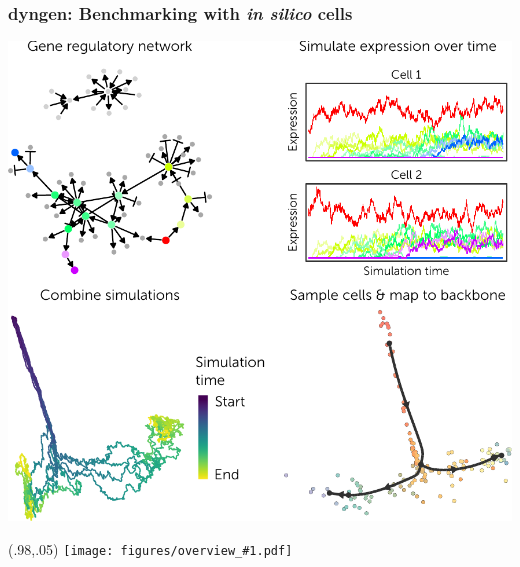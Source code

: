 \documentclass[usepdftitle=false, compress]{beamer}
\newcommand{\topright}[1]{%
\begin{textblock*}{.15\linewidth}(.98\linewidth,.05\linewidth)
	\texttt{[image: figures/overview\_\#1.pdf]}
\end{textblock*}}
\begin{document}
\begin{frame}
	\frametitle{dyngen: Benchmarking with \textit{in silico} cells}
	\begin{center}
		\includegraphics[width=.6\linewidth]{figures/end_part_dyngen.pdf}
	\end{center}
	\topright{ch2}
\end{frame}
\end{document}
